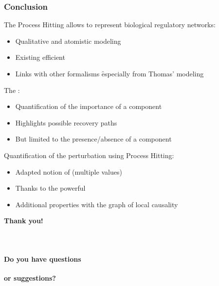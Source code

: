 
\begin{frame}[c]
  \frametitle{Conclusion}

The Process Hitting allows to represent biological regulatory networks:
\begin{itemize}
  \item Qualitative and atomistic modeling
  \item Existing efficient 
  \item Links with other formalisms \f especially from Thomas' modeling
\end{itemize}

\pause
\bigskip
The :
\begin{itemize}
  \item Quantification of the importance of a component
  \item Highlights possible recovery paths
  \item But limited to the presence/absence of a component
\end{itemize}

\pause
\bigskip
Quantification of the perturbation using Process Hitting:
\begin{itemize}
  \item Adapted notion of  (multiple values)
  \item Thanks to the powerful 
  \item Additional properties with the graph of local causality
\end{itemize}
\end{frame}



\begin{frame}[c]
\vspace*{2cm}
\centering
\Large
\bfseries
\textcolor{couleurtheme}{
Thank you!\qquad~\\~\\~\\~\\
Do you have questions\qquad~\\~\\
or suggestions?\qquad~\\
}
\end{frame}
